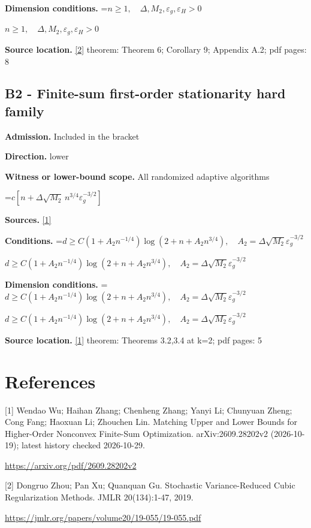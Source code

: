 \documentclass[10pt,a4paper]{article}
\newcommand{\AtlasMath}[1]{\par\begingroup\centering\setbox0=\hbox{$\displaystyle #1$}\ifdim\wd0>1.4\linewidth\typeout{ATLAS WIDE FORMULA: \the\wd0}\fi\ifdim\wd0>\linewidth\resizebox{\linewidth}{!}{\box0}\else\box0\fi\par\endgroup}
\newcommand{\AtlasInlineMath}[1]{\begingroup\setbox0=\hbox{$#1$}\ifdim\wd0>.4\linewidth\endgroup\AtlasMath{#1}\else\endgroup$#1$\fi}
\begin{document}
\textbf{Dimension conditions.} \AtlasInlineMath{n\ge1,\quad\Delta,M_2,\varepsilon_g,\varepsilon_H>0}

\textbf{Source location.} \href{https://jmlr.org/papers/volume20/19-055/19-055.pdf}{[2]} theorem: Theorem 6; Corollary 9; Appendix A.2; pdf pages: 8

\subsection{B2 - Finite-sum first-order stationarity hard family}
\textbf{Admission.} Included in the bracket

\textbf{Direction.} lower

\textbf{Witness or lower-bound scope.} All randomized adaptive algorithms

\AtlasMath{c[n+\Delta\sqrt{M_2}\,n^{3/4}\varepsilon_g^{-3/2}]}
\textbf{Sources.} \href{https://arxiv.org/pdf/2609.28202v2}{[1]}

\textbf{Conditions.} \AtlasInlineMath{d\ge C(1+A_2n^{-1/4})\log(2+n+A_2n^{3/4}),\quad A_2=\Delta\sqrt{M_2}\varepsilon_g^{-3/2}}

\textbf{Dimension conditions.} \AtlasInlineMath{d\ge C(1+A_2n^{-1/4})\log(2+n+A_2n^{3/4}),\quad A_2=\Delta\sqrt{M_2}\varepsilon_g^{-3/2}}

\textbf{Source location.} \href{https://arxiv.org/pdf/2609.28202v2}{[1]} theorem: Theorems 3.2,3.4 at k=2; pdf pages: 5

\section{References}
[1] Wendao Wu; Haihan Zhang; Chenheng Zhang; Yanyi Li; Chunyuan Zheng; Cong Fang; Haoxuan Li; Zhouchen Lin. Matching Upper and Lower Bounds for Higher-Order Nonconvex Finite-Sum Optimization. arXiv:2609.28202v2 (2026-10-19); latest history checked 2026-10-29.

\url{https://arxiv.org/pdf/2609.28202v2}

[2] Dongruo Zhou; Pan Xu; Quanquan Gu. Stochastic Variance-Reduced Cubic Regularization Methods. JMLR 20(134):1-47, 2019.

\url{https://jmlr.org/papers/volume20/19-055/19-055.pdf}
\end{document}
